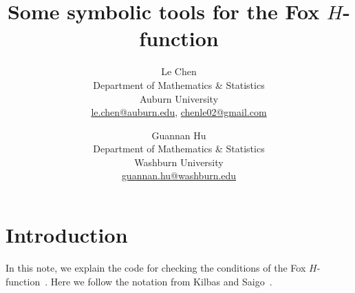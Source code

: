 \documentclass[11pt]{article}
\begin{document}
\title{Some symbolic tools for the {F}ox {$H$}-function}
\author{Le Chen   \\
  Department of Mathematics \& Statistics \\
  Auburn University \\
  \url{le.chen@auburn.edu}, \url{chenle02@gmail.com}
  \and
  Guannan Hu \\
  Department of Mathematics \& Statistics \\
  Washburn University\\
  \url{guannan.hu@washburn.edu}
}

\maketitle
\tableofcontents

\section{Introduction}
In this note, we explain the code for checking the conditions of the Fox
$H$-function~\cite{fox:61:g}. Here we follow the notation from Kilbas and
Saigo~\cite{kilbas.saigo:04:h-transforms}. \bigskip
\end{document}
